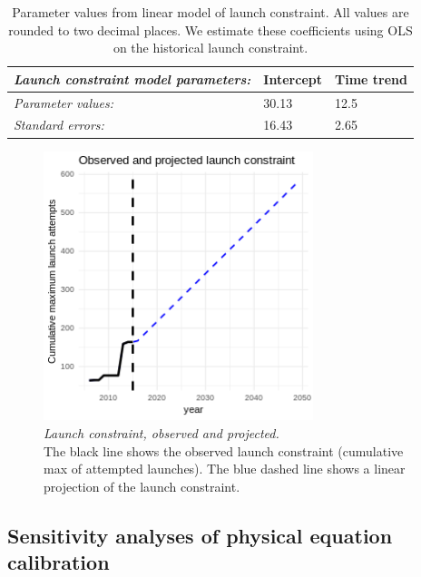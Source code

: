 \documentclass[12pt]{article}
\begin{document}
\begin{table}[H]
	\centering
	\begin{tabular}{|l|l|l|}
		\hline
		\textit{Launch constraint model parameters:} & Intercept & Time trend \\ \hline
		\textit{Parameter values:}                   & 30.13     & 12.5       \\ \hline
		\textit{Standard errors:}                    & 16.43     & 2.65       \\ \hline
	\end{tabular}
	\caption[Parameter values from linear model of launch constraint]{Parameter values from linear model of launch constraint. All values are rounded to two decimal places. We estimate these coefficients using OLS on the historical launch constraint.}
	\label{lc_coefs}
\end{table}

\begin{figure}[H]
	\centering
	\includegraphics[width=0.7\textwidth]{../../images/linear_trend_launch_constraint.png}
	\captionsetup{format=hang}
	\caption[Observed and projected launch constraint]{\textit{Launch constraint, observed and projected.} \\
		The black line shows the observed launch constraint (cumulative max of attempted launches). The blue dashed line shows a linear projection of the launch constraint.
	}
	\label{lc_time_path}
\end{figure}

\subsection{Sensitivity analyses of physical equation calibration}
\label{physicsSensitivity}
\end{document}
